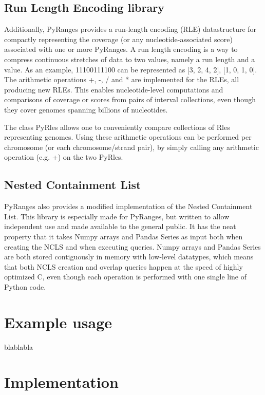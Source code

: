 \documentclass[10pt,letterpaper]{article}
\begin{document}
\subsection*{Run Length Encoding library}

Additionally, PyRanges provides a run-length encoding (RLE) datastructure for
compactly representing the coverage (or any nucleotide-associated score)
associated with one or more PyRanges. A run length encoding is a way to compress
continuous stretches of data to two values, namely a run length and a value. As
an example, 11100111100 can be represented as [3, 2, 4, 2], [1, 0, 1, 0]. The
arithmetic operations +, -, / and * are implemented for the RLEs, all producing
new RLEs. This enables nucleotide-level computations and comparisons of coverage
or scores from pairs of interval collections, even though they cover genomes
spanning billions of nucleotides.

The class PyRles allows one to conveniently compare collections of Rles
representing genomes. Using these arithmetic operations can be performed per
chromosome (or each chromosome/strand pair), by simply calling any arithmetic
operation (e.g. +) on the two PyRles.

\subsection*{Nested Containment List}

PyRanges also provides a modified implementation of the Nested Containment List.
This library is especially made for PyRanges, but written to allow independent
use and made available to the general public. It has the neat property that it
takes Numpy arrays and Pandas Series as input both when creating the NCLS and
when executing queries. Numpy arrays and Pandas Series are both stored
contiguously in memory with low-level datatypes, which means that both NCLS
creation and overlap queries happen at the speed of highly optimized C, even
though each operation is performed with one single line of Python code.

\section*{Example usage}

blablabla

\section*{Implementation}
\end{document}
